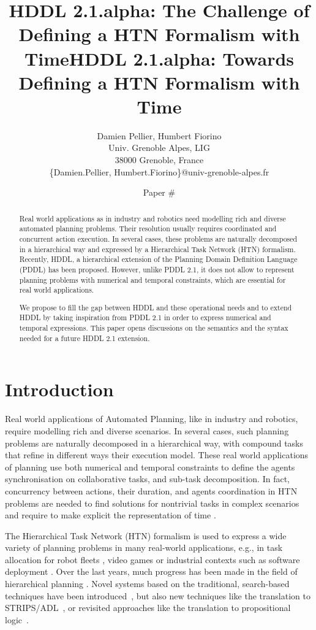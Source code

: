 \documentclass[letterpaper]{article} %
\title{HDDL 2.1.alpha: The Challenge of Defining a HTN Formalism with Time}
\author{
Damien Pellier, Humbert Fiorino\\
Univ. Grenoble Alpes, LIG\\
38000 Grenoble, France\\
\{Damien.Pellier, Humbert.Fiorino\}@univ-grenoble-alpes.fr}
\title{HDDL 2.1.alpha: Towards Defining a HTN Formalism with Time}
\author{Paper \#}
\begin{document}
\maketitle

\begin{abstract}
Real world applications as in industry and robotics need modelling rich and diverse automated planning problems. Their resolution usually requires coordinated and concurrent action execution. In several cases, these problems are naturally decomposed in a hierarchical way and expressed by a Hierarchical Task Network (HTN) formalism. Recently, HDDL, a hierarchical extension of the Planning Domain Definition Language (PDDL) has been proposed. However, unlike PDDL 2.1, it does not allow to represent planning problems with numerical and temporal constraints, which are essential for real world applications.

We propose to fill the gap between HDDL and these operational needs and to extend HDDL by taking inspiration from  PDDL 2.1 in order to express numerical and temporal expressions. This paper opens discussions on the semantics and the syntax needed for a future HDDL 2.1 extension.
\end{abstract}

\section{Introduction}

Real world applications of Automated Planning, like in industry and robotics, require modelling rich and diverse scenarios.
In several cases, such  planning problems are naturally decomposed in a hierarchical way, with compound tasks that refine in different ways their execution model.
These real world applications of planning use both numerical and temporal constraints to define the agents synchronisation on collaborative tasks, and sub-task decomposition. In fact, concurrency between actions, their duration, and agents coordination in HTN problems are needed to find solutions for nontrivial tasks in complex scenarios and require to make explicit the representation of time \citep{ghallabnautraverso2016}.

The Hierarchical Task Network (HTN) formalism \citep{erol94} is used to express a wide variety of planning problems in many real-world applications, e.g., in task allocation for robot fleets \citep{Milot21}, video games \citep{Menif14} or industrial contexts such as software deployment \citep{Georgievski17}. Over the last years, much progress has been made in the field of hierarchical planning \citep{bercher19}. Novel systems based on the traditional, search-based techniques have been introduced~\citep{Bit-Monnot:16,ramoul17,Shivashankar17,Bercher17,Holler19,holler20,Holler21}, but also new techniques like the translation to STRIPS/ADL~\citep{Alford09,Alford16,behnke2022}, or revisited approaches like the translation to propositional logic~\citep{behnke2018totsat,Behnke2019orderchaos,Schreiber2019SAT,Schreiber21,behnke2021}.
\end{document}
